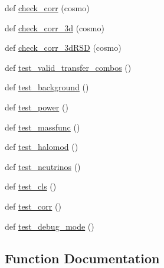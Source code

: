 \begin{DoxyCompactItemize}
\item 
def \mbox{\hyperlink{namespaceccl__test__pyccl__interface_a3fae4f90be1642643dc2c746846a3e10}{check\+\_\+corr}} (cosmo)
\item 
def \mbox{\hyperlink{namespaceccl__test__pyccl__interface_a1ad832016b388d40507aac3844c14ec4}{check\+\_\+corr\+\_\+3d}} (cosmo)
\item 
def \mbox{\hyperlink{namespaceccl__test__pyccl__interface_aa8e3694e3fffe81ea6217b51f7d6cec5}{check\+\_\+corr\+\_\+3d\+R\+SD}} (cosmo)
\item 
def \mbox{\hyperlink{namespaceccl__test__pyccl__interface_a64e29dd68981ffe884100ab216146869}{test\+\_\+valid\+\_\+transfer\+\_\+combos}} ()
\item 
def \mbox{\hyperlink{namespaceccl__test__pyccl__interface_ac8e0f5304f7823f08dd48bd16736cbde}{test\+\_\+background}} ()
\item 
def \mbox{\hyperlink{namespaceccl__test__pyccl__interface_aa0fa1e5e5f099cfa4e0c55e8cc80f585}{test\+\_\+power}} ()
\item 
def \mbox{\hyperlink{namespaceccl__test__pyccl__interface_a7aa32506e6319a810450e886106d3207}{test\+\_\+massfunc}} ()
\item 
def \mbox{\hyperlink{namespaceccl__test__pyccl__interface_a1936b759676e55f5a5c9a339af0bba48}{test\+\_\+halomod}} ()
\item 
def \mbox{\hyperlink{namespaceccl__test__pyccl__interface_ae4c580c07c1b1ff62524d160ea8d6756}{test\+\_\+neutrinos}} ()
\item 
def \mbox{\hyperlink{namespaceccl__test__pyccl__interface_af43480922699de3f04ac202305e22666}{test\+\_\+cls}} ()
\item 
def \mbox{\hyperlink{namespaceccl__test__pyccl__interface_ac7244d534c03943f2b622f66d8b5e431}{test\+\_\+corr}} ()
\item 
def \mbox{\hyperlink{namespaceccl__test__pyccl__interface_aefa58335e41682f374a241db87d26278}{test\+\_\+debug\+\_\+mode}} ()
\end{DoxyCompactItemize}


\subsection{Function Documentation}
\mbox{\label{namespaceccl__test__pyccl__interface_aecd07d8c3c95bccf7dad21e068684ad0}} 
